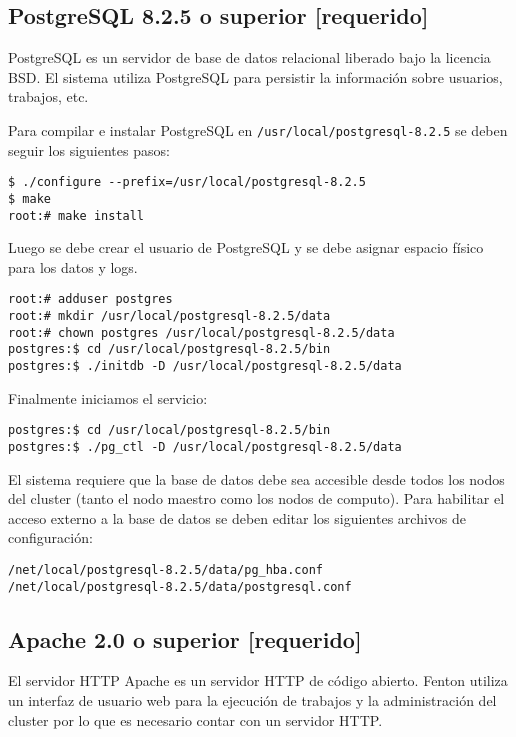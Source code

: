 \documentclass[a4paper,10pt,spanish]{article}
\begin{document}
\subsection{PostgreSQL 8.2.5 o superior \small{[requerido]}}

PostgreSQL\cite{postgres} es un servidor de base de datos relacional liberado bajo la licencia BSD. El sistema utiliza PostgreSQL para persistir la informaci\'{o}n sobre usuarios, trabajos, etc.

Para compilar e instalar PostgreSQL en \mbox{\texttt{/usr/local/postgresql-8.2.5}} se deben seguir los siguientes pasos:

\begin{verbatim}
$ ./configure --prefix=/usr/local/postgresql-8.2.5
$ make
root:# make install
\end{verbatim}

Luego se debe crear el usuario de PostgreSQL y se debe asignar espacio f\'{i}sico para los datos y logs.

\begin{verbatim}
root:# adduser postgres 
root:# mkdir /usr/local/postgresql-8.2.5/data 
root:# chown postgres /usr/local/postgresql-8.2.5/data 
postgres:$ cd /usr/local/postgresql-8.2.5/bin
postgres:$ ./initdb -D /usr/local/postgresql-8.2.5/data 
\end{verbatim}

Finalmente iniciamos el servicio:

\begin{verbatim}
postgres:$ cd /usr/local/postgresql-8.2.5/bin
postgres:$ ./pg_ctl -D /usr/local/postgresql-8.2.5/data
\end{verbatim}

El sistema requiere que la base de datos debe sea accesible desde todos los nodos del cluster (tanto el nodo maestro como los nodos de computo). Para habilitar el acceso externo a la base de datos se deben editar los siguientes archivos de configuraci\'{o}n:
\begin{verbatim}
/net/local/postgresql-8.2.5/data/pg_hba.conf
/net/local/postgresql-8.2.5/data/postgresql.conf
\end{verbatim}

\subsection{Apache 2.0 o superior \small{[requerido]}}

El servidor HTTP Apache\cite{apache} es un servidor HTTP de c\'{o}digo abierto. Fenton utiliza un interfaz de usuario web para la ejecuci\'{o}n de trabajos y la administraci\'{o}n del cluster por lo que es necesario contar con un servidor HTTP.
\end{document}

